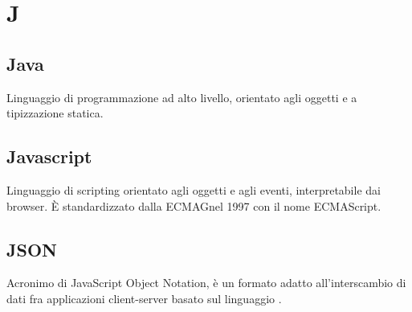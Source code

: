 \section*{J}
\markright{}
\subsection*{Java}
Linguaggio di programmazione ad alto livello, orientato agli oggetti e a tipizzazione statica.

\subsection*{Javascript}
Linguaggio di scripting orientato agli oggetti e agli eventi, interpretabile dai browser. È standardizzato dalla ECMAGnel 1997 con il nome ECMAScript.

\subsection*{JSON}
Acronimo di JavaScript Object Notation, è un formato adatto all'interscambio di dati fra applicazioni client-server basato sul linguaggio .